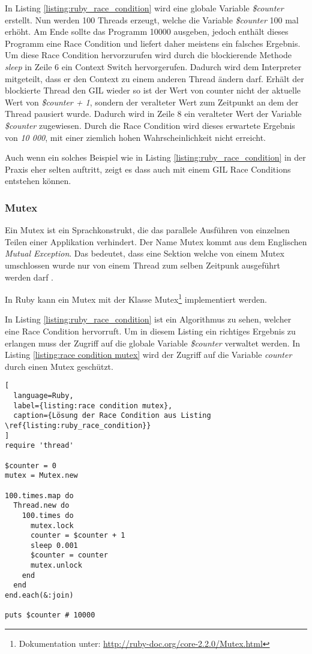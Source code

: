 In Listing \ref{listing:ruby_race_condition} wird eine globale Variable \emph{\$counter} erstellt. Nun werden 100 Threads erzeugt, welche die Variable \emph{\$counter} 100 mal erhöht. Am Ende sollte das Programm 10000 ausgeben, jedoch enthält dieses Programm eine Race Condition und liefert daher meistens ein falsches Ergebnis. Um diese Race Condition hervorzurufen wird durch die blockierende Methode \emph{sleep} in Zeile 6 ein Context Switch hervorgerufen. Dadurch wird dem Interpreter mitgeteilt, dass er den Context zu einem anderen Thread ändern darf. Erhält der blockierte Thread den GIL wieder so ist der Wert von counter nicht der aktuelle Wert von  \emph{\$counter + 1}, sondern der veralteter Wert zum Zeitpunkt an dem der Thread pausiert wurde. Dadurch wird in Zeile 8 ein veralteter Wert der Variable \emph{\$counter} zugewiesen. Durch die Race Condition wird dieses erwartete Ergebnis von \emph{10 000}, mit einer ziemlich hohen Wahrscheinlichkeit nicht erreicht.

Auch wenn ein solches Beispiel wie in Listing \ref{listing:ruby_race_condition} in der Praxis eher selten auftritt, zeigt es dass auch mit einem GIL Race Conditions entstehen können.

\subsubsection{Mutex}
Ein Mutex ist ein Sprachkonstrukt, die das parallele Ausführen von einzelnen Teilen einer Applikation verhindert. Der Name Mutex kommt aus dem Englischen \emph{Mutual Exception}. Das bedeutet, dass eine Sektion welche von einem Mutex umschlossen wurde nur von einem Thread zum selben Zeitpunk ausgeführt werden darf \cite[p. 81]{Sto2013}. 

In Ruby kann ein Mutex mit der Klasse Mutex\footnote{Dokumentation unter:  \url{http://ruby-doc.org/core-2.2.0/Mutex.html}} implementiert werden.

In Listing \ref{listing:ruby_race_condition} ist ein Algorithmus zu sehen, welcher eine Race Condition hervorruft. Um in diesem Listing ein richtiges Ergebnis zu erlangen muss der Zugriff auf die globale Variable \emph{\$counter} verwaltet werden. In Listing \ref{listing:race condition mutex} wird der Zugriff auf die Variable \emph{counter} durch einen Mutex geschützt. 

\begin{lstlisting}[
  language=Ruby,
  label={listing:race condition mutex},
  caption={Lösung der Race Condition aus Listing \ref{listing:ruby_race_condition}}
]
require 'thread'

$counter = 0
mutex = Mutex.new

100.times.map do
  Thread.new do
    100.times do
      mutex.lock
      counter = $counter + 1
      sleep 0.001
      $counter = counter
      mutex.unlock
    end
  end
end.each(&:join)

puts $counter # 10000
\end{lstlisting}


